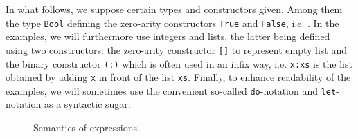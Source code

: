 \documentclass[submission,copyright,creativecommons]{eptcs}
\begin{document}
In what follows, we suppose certain types and constructors given. Among them the type \texttt{Bool} defining the zero-arity constructors \texttt{True} and \texttt{False}, i.e.  . In the examples, we will furthermore use integers and lists, the latter being defined using two constructors: the zero-arity constructor \texttt{[]} to represent empty list and the binary constructor \texttt{(:)} which is often used in an infix way, i.e. \texttt{x:xs} is the list obtained by adding \texttt{x} in front of the list \texttt{xs}. Finally, to enhance readability of the examples, we will sometimes use the convenient so-called \texttt{do}-notation \cite{composable-memory-transactions} and \texttt{let}-notation as a syntactic sugar:


\begin{center}

\end{center}

\newcommand{\cpl}[1]{\ensuremath{\langle #1 \rangle}}

\begin{figure*}[htb]
  \centering
{}
\caption{Semantics of  expressions.}
  \label{fig:semantics}
\end{figure*}
\end{document}
